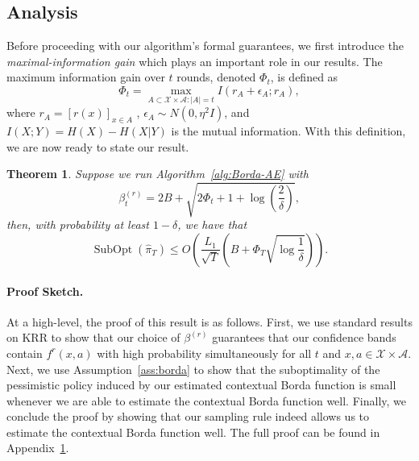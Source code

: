\documentclass{article} \usepackage{iclr2023_conference,times}
\newcommand{\Contextspace}{\mathcal{X}}
\newcommand{\Actionspace}{\mathcal{A}}
\newcommand{\subopt}{\operatorname{SubOpt}}
\newtheorem{theorem}{Theorem}
\begin{document}
\vspace{-4mm}
\subsection{Analysis}
\label{s:kocdb_analysis}
\vspace{-1mm}
Before proceeding with our algorithm's formal guarantees, we first introduce the \emph{maximal-information gain} which plays an important role in our results.
The maximum information gain over $t$ rounds, denoted $\Phi_t$, is defined as
\begin{equation}
    \Phi_t = \max_{A \subset \Contextspace\times\Actionspace: \left \lvert A \right\rvert = t} I(r_A + \epsilon_A; r_A),
\end{equation}
where $r_{A} = \left[ r(x) \right]_{x \in A}$ , $\epsilon_A \sim N(0, \eta^2 I)$, and $I(X; Y) = H(X) - H(X | Y)$ is the mutual information.
With this definition, we are now ready to state our result.
\begin{theorem}
    \label{thm:regret}
    Suppose we run Algorithm~\ref{alg:Borda-AE} with
    \begin{equation}
        \beta^{(r)}_t = 2B + \sqrt{2 \Phi_t + 1 + \log \left( \frac 2 \delta \right)},
    \end{equation}
    then, with probability at least $1 - \delta$, we have that
    \begin{equation}
        \subopt(\hat \pi_T) \leq O \left(  \frac{L_1}{\sqrt{T}} \left(B + \Phi_T\sqrt{\log \frac{1}{\delta}} \right)\right).
    \end{equation}
\end{theorem}
\paragraph{Proof Sketch.}
At a high-level, the proof of this result is as follows.
First, we use standard results on KRR to show that our choice of $\beta^{(r)}$ guarantees that our confidence bands contain $f^r(x, a)$ with high probability simultaneously for all $t$ and $x, a \in \Contextspace \times \Actionspace$.
Next, we use Assumption~\ref{ass:borda} to show that the suboptimality of the  pessimistic policy induced by our estimated contextual Borda function is small whenever we are able to estimate the contextual Borda function well.
Finally, we conclude the proof by showing that our sampling rule indeed allows us to estimate the contextual Borda function well.
The full proof can be found in Appendix~\ref{thm:regret}.
\end{document}
